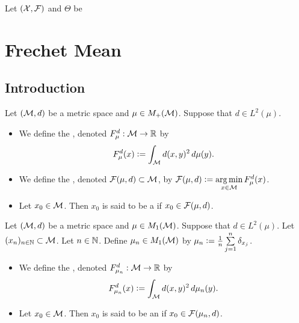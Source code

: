 \documentclass{book}
\begin{document}
	\begin{defn}
	Let $(\mathcal{X}, \mathcal{F})$ and $\Theta$ be
	\end{defn}	






















	\newpage
	\section{Frechet Mean}
	
	\subsection{Introduction}
	
	\begin{defn}
		Let $(\mathcal{M}, d)$ be a metric space and $\mu \in M_+(\mathcal{M})$. Suppose that $d \in L^2(\mu)$. 
		\begin{itemize}
			\item We define the , denoted $F^d_{\mu}: \mathcal{M} \rightarrow \mathbb{R}$ by 
			$$F_{\mu}^d(x) \vcentcolon= \int_{\mathcal{M}} d(x, y)^2 \, d \mu(y).$$
			\item We define the , denoted $\mathcal{F}(\mu, d) \subset \mathcal{M}$, by $\mathcal{F}(\mu, d) \vcentcolon= \operatorname*{arg\,min}\limits_{x \in \mathcal{M}} F^d_{\mu}(x)$.  
			\item Let $x_0 \in \mathcal{M}$. Then $x_0$ is said to be a  if $x_0 \in \mathcal{F}(\mu, d)$. 
		\end{itemize}
	\end{defn}	

	\begin{defn}
		Let $(\mathcal{M}, d)$ be a metric space and $\mu \in M_1(\mathcal{M})$. Suppose that $d \in L^2(\mu)$. Let $(x_n)_{n \in \mathbb{N}} \subset \mathcal{M}$. Let $n \in \mathbb{N}$. Define $\mu_n \in M_1(\mathcal{M})$ by $\mu_n \vcentcolon= \frac{1}{n} \sum\limits_{j=1}^n \delta_{x_j}$.
		\begin{itemize}
			\item We define the , denoted $F^d_{\mu_n}: \mathcal{M} \rightarrow \mathbb{R}$ by 
			$$ F^d_{\mu_n}(x) \vcentcolon= \int_{\mathcal{M}} d(x, y)^2 \, d \mu_n(y).$$
			\item Let $x_0 \in \mathcal{M}$. Then $x_0$ is said to be an  if $x_0 \in \mathcal{F}(\mu_n, d)$. 
		\end{itemize}
	\end{defn}
\end{document}
